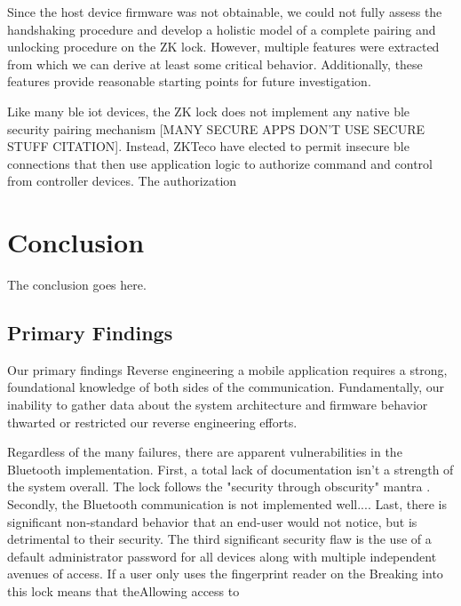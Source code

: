 \documentclass[journal]{IEEEtran}
\begin{document}
Since the host device firmware was not obtainable, we could not fully assess the handshaking procedure and develop a holistic model of a complete pairing and unlocking procedure on the ZK lock.  However, multiple features were extracted from which we can derive at least some critical behavior.  Additionally, these features provide reasonable starting points for future investigation.

\bigskip

Like many \gls{ble} \gls{iot} devices, the ZK lock does not implement any native \gls{ble} security pairing mechanism [MANY SECURE APPS DON'T USE SECURE STUFF CITATION].  Instead, ZKTeco have elected to permit insecure \gls{ble} connections that then use application logic to authorize command and control from controller devices.  The authorization 

\section{Conclusion}
The conclusion goes here.

\subsection{Primary Findings}



Our primary findings
Reverse engineering a mobile application requires a strong, foundational knowledge of both sides of the communication. Fundamentally, our inability to gather data about the system architecture and firmware behavior thwarted or restricted our reverse engineering efforts.

Regardless of the many failures, there are apparent vulnerabilities in the Bluetooth implementation. First, a total lack of documentation isn't a strength of the system overall. The lock follows the "security through obscurity" mantra \cite{Mercuri, 2003}. Secondly, the Bluetooth communication is not implemented well....
Last, there is significant non-standard behavior that an end-user would not notice, but is detrimental to their security. 
The third significant security flaw is the use of a default administrator password for all devices along with multiple independent avenues of access. If a user only uses the fingerprint reader on the 
Breaking into this lock means that theAllowing access to 
\end{document}
